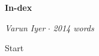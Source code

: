\documentclass[12pt]{article}
\begin{document}

	\begin{center}
		\textbf{In-dex}

		\emph{Varun Iyer} \hspace{.34em}$\cdot$\hspace{.34em} \emph{2014 words}
	\end{center}
	\par

	Start
\end{document}
